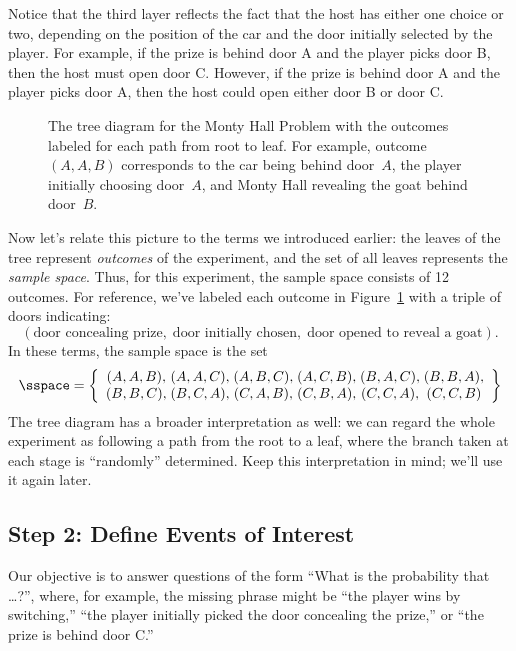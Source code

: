 Notice that the third layer reflects the fact that the host has either one
choice or two, depending on the position of the car and the door initially
selected by the player.  For example, if the prize is behind door A and
the player picks door B, then the host must open door C.  However, if the
prize is behind door A and the player picks door A, then the host could
open either door B or door C.

\begin{figure}


\caption{The tree diagram for the Monty Hall Problem with the outcomes
  labeled for each path from root to leaf.  For example, outcome $(A,
  A, B)$ corresponds to the car being behind door~$A$, the player
  initially choosing door~$A$, and Monty Hall revealing the goat
  behind door~$B$.}

\label{fig:14A3}

\end{figure}

Now let's relate this picture to the terms we introduced earlier: the
leaves of the tree represent \emph{outcomes} of the experiment, and
the set of all leaves represents the \emph{sample space}.  Thus, for
this experiment, the sample space consists of 12 outcomes.  For
reference, we've labeled each outcome in Figure~\ref{fig:14A3} with a
triple of doors indicating:
%
\[
    (\text{door concealing prize}, \;
    \text{door initially chosen}, \;
     \text{door opened to reveal a goat}).
\]
%
In these terms, the sample space is the set
%
\[
\sspace = \left\{
\begin{array}{c@{\;}c@{\;}c@{\;}c@{\;}c@{\;}c}
(A, A, B), & (A, A, C), & (A, B, C), & (A, C, B), & (B, A, C), & (B, B, A), \\
(B, B, C), & (B, C, A), & (C, A, B), & (C, B, A), & (C, C, A), & (C, C, B)
\end{array}
\right\}
\]
%
The tree diagram has a broader interpretation as well: we can regard the
whole experiment as following a path from the root to a leaf, where the
branch taken at each stage is ``randomly'' determined.  Keep this
interpretation in mind; we'll use it again later.

\subsection{Step 2: Define Events of Interest}

Our objective is to answer questions of the form ``What is the
probability that \dots ?'', where, for example, the missing phrase
might be ``the player wins by switching,'' ``the player initially
picked the door concealing the prize,'' or ``the prize is behind door
C.''

